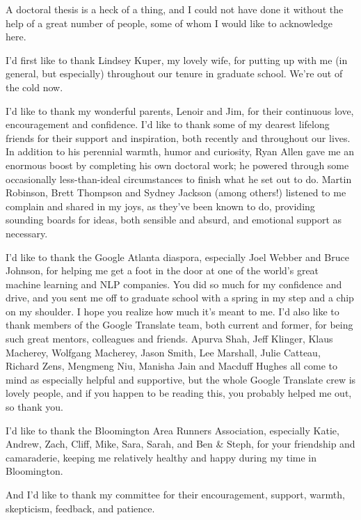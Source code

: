 
A doctoral thesis is a heck of a thing, and I could not have done it without
the help of a great number of people, some of whom I would like to acknowledge
here.

I'd first like to thank Lindsey Kuper, my lovely wife, for putting up with me
(in general, but especially) throughout our tenure in graduate school. We're
out of the cold now.

I'd like to thank my wonderful parents, Lenoir and Jim, for their continuous
love, encouragement and confidence.
I'd like to thank some of my dearest lifelong friends for their support and
inspiration, both recently and throughout our lives.
In addition to his perennial warmth, humor and curiosity, Ryan Allen gave me an
enormous boost by completing his own doctoral work\cite{allen2017visions}; he
powered through some occasionally less-than-ideal circumstances to finish what
he set out to do. Martin Robinson, Brett Thompson and Sydney Jackson (among
others!) listened to me complain and shared in my joys, as they've been known
to do, providing sounding boards for ideas, both sensible and absurd, and
emotional support as necessary.

I'd like to thank the Google Atlanta diaspora, especially Joel Webber and Bruce
Johnson, for helping me get a foot in the door at one of the world's great
machine learning and NLP companies. You did so much for my confidence and
drive, and you sent me off to graduate school with a spring in my step and a
chip on my shoulder. I hope you realize how much it's meant to me. I'd also
like to thank members of the Google Translate team, both current and former,
for being such great mentors, colleagues and friends. Apurva Shah, Jeff
Klinger, Klaus Macherey, Wolfgang Macherey, Jason Smith, Lee Marshall, Julie
Catteau, Richard Zens, Mengmeng Niu, Manisha Jain and Macduff Hughes all come
to mind as especially helpful and supportive, but the whole Google Translate
crew is lovely people, and if you happen to be reading this, you probably
helped me out, so thank you.

I'd like to thank the Bloomington Area Runners Association, especially Katie,
Andrew, Zach, Cliff, Mike, Sara, Sarah, and Ben \& Steph, for your friendship
and camaraderie, keeping me relatively healthy and happy during my time in
Bloomington.

And I'd like to thank my committee for their encouragement, support, warmth,
skepticism, feedback, and patience.
